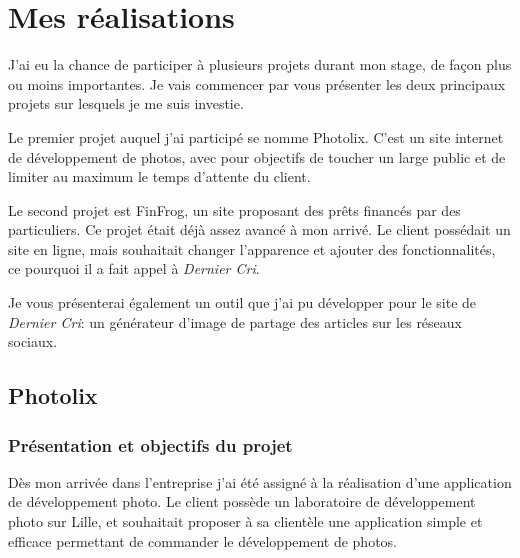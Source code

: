 \documentclass[12pt,a4paper]{article}
\begin{document}
  \newpage

  \section{Mes réalisations}\label{mes-ruxe9alisations}

  \bigskip

  J'ai eu la chance de participer à plusieurs projets durant mon stage, de
  façon plus ou moins importantes. Je vais commencer par vous présenter
  les deux principaux projets sur lesquels je me suis investie.

  \bigskip

  Le premier projet auquel j'ai participé se nomme Photolix. C'est un site
  internet de développement de photos, avec pour objectifs de toucher un
  large public et de limiter au maximum le temps d'attente du client.

  \bigskip

  Le second projet est FinFrog, un site proposant des prêts financés par
  des particuliers. Ce projet était déjà assez avancé à mon arrivé. Le
  client possédait un site en ligne, mais souhaitait changer l'apparence
  et ajouter des fonctionnalités, ce pourquoi il a fait appel à
  \emph{Dernier Cri}.

  \bigskip

  Je vous présenterai également un outil que j'ai pu développer pour le
  site de \emph{Dernier Cri}: un générateur d'image de partage des
  articles sur les réseaux sociaux.

  \bigskip

  \subsection{Photolix}\label{photolix}

  \subsubsection{Présentation et objectifs du
  projet}\label{pruxe9sentation-et-objectifs-du-projet}

  \bigskip

  Dès mon arrivée dans l'entreprise j'ai été assigné à la réalisation
  d'une application de développement photo. Le client possède un
  laboratoire de développement photo sur Lille, et souhaitait proposer à
  sa clientèle une application simple et efficace permettant de commander
  le développement de photos.

  \bigskip
\end{document}
